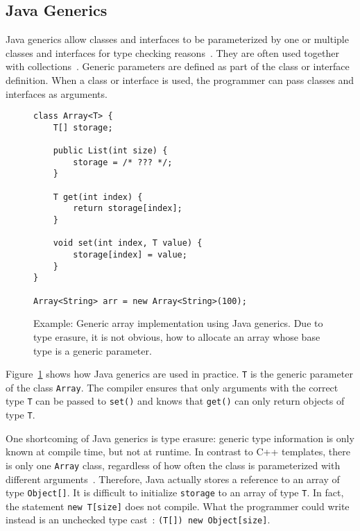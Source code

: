 \subsection{Java Generics}
Java generics allow classes and interfaces to be parameterized by one or multiple classes and interfaces for type checking reasons~\cite{bracha2004generics, Bracha03addinggenerics}. They are often used together with collections~\cite{Parnin:2011:JGA:1985441.1985446}. Generic parameters are defined as part of the class or interface definition. When a class or interface is used, the programmer can pass classes and interfaces as arguments.

\begin{figure}[!htp]
\begin{lstlisting}
class Array<T> {
    T[] storage;

    public List(int size) {
        storage = /* ??? */;
    }

    T get(int index) {
        return storage[index];
    }

    void set(int index, T value) {
        storage[index] = value;
    }
}

Array<String> arr = new Array<String>(100);
\end{lstlisting}
\caption[Example: Generic array implementation using Java generics]{Example: Generic array implementation using Java generics. Due to type erasure, it is not obvious, how to allocate an array whose base type is a generic parameter.}
\label{fig:rel_java_generics}
\end{figure}

Figure~\ref{fig:rel_java_generics} shows how Java generics are used in practice. \texttt{T} is the generic parameter of the class \texttt{Array}. The compiler ensures that only arguments with the correct type \texttt{T} can be passed to \texttt{set()} and knows that \texttt{get()} can only return objects of type \texttt{T}. 

One shortcoming of Java generics is type erasure: generic type information is only known at compile time, but not at runtime. In contrast to C++ templates, there is only one \texttt{Array} class, regardless of how often the class is parameterized with different arguments~\cite{lembcke2006specialization}. Therefore, Java actually stores a reference to an array of type \texttt{Object[]}. It is difficult to initialize \texttt{storage} to an array of type \texttt{T}. In fact, the statement \texttt{new T[size]} does not compile. What the programmer could write instead is an unchecked type cast~\cite{nino2007cost}: \texttt{(T[]) new Object[size]}.

